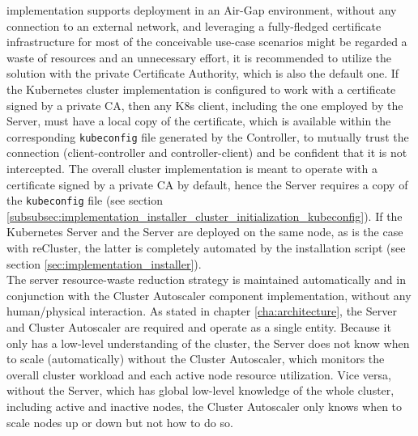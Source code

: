 implementation supports deployment in an Air-Gap environment, without any connection
to an external network, and leveraging a fully-fledged certificate
infrastructure for most of the conceivable use-case scenarios might be regarded
a waste of resources and an unnecessary effort, it is recommended to utilize the
solution with the private Certificate Authority, which is also the default one. If
the Kubernetes cluster implementation is configured to work with a certificate signed
by a private CA, then any K8s client, including the one employed by the Server,
must have a local copy of the certificate, which is available within the corresponding
\texttt{kubeconfig} file generated by the Controller, to mutually trust the connection
(client-controller and controller-client) and be confident that it is not intercepted\cite{k8s_api_access}.
The overall cluster implementation is meant to operate with a certificate signed
by a private CA by default, hence the Server requires a copy of the \texttt{kubeconfig}
file (see section
\ref{subsubsec:implementation_installer_cluster_initialization_kubeconfig}). If
the Kubernetes Server and the Server are deployed on the same node, as is the case
with reCluster, the latter is completely automated by the installation script (see
section \ref{sec:implementation_installer}). \\ %
The server resource-waste reduction strategy is maintained automatically and in
conjunction with the Cluster Autoscaler component implementation, without any human/physical
interaction. As stated in chapter \ref{cha:architecture}, the Server and Cluster
Autoscaler are required and operate as a single entity. Because it only has a
low-level understanding of the cluster, the Server does not know when to scale (automatically)
without the Cluster Autoscaler, which monitors the overall cluster workload and
each active node resource utilization. Vice versa, without the Server, which has
global low-level knowledge of the whole cluster, including active and inactive
nodes, the Cluster Autoscaler only knows when to scale nodes up or down but not how
to do so.

